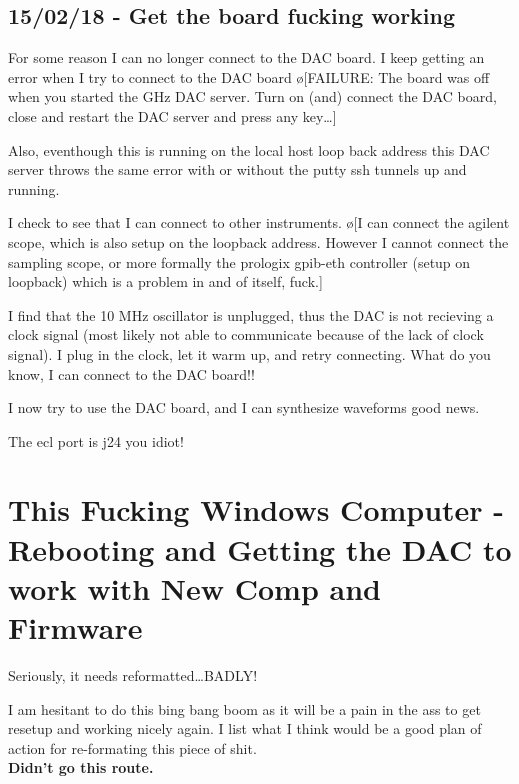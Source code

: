 \documentclass[10pt]{book}
\begin{document}
\section{15/02/18 - Get the board fucking working}
For some reason I can no longer connect to the DAC board. I keep getting an error when I try to connect to the DAC board \o[FAILURE: The board was off when you started the GHz DAC server. Turn on (and) connect the DAC board, close and restart the DAC server and press any key\ldots ]{}

Also, eventhough this is running on the local host loop back address this DAC server throws the same error with or without the putty ssh tunnels up and running.

I check to see that I can connect to other instruments. \o[I can connect the agilent scope, which is also setup on the loopback address. However I cannot connect the sampling scope, or more formally the prologix gpib-eth controller (setup on loopback) which is a problem in and of itself, fuck.]{}

I find that the 10 MHz oscillator is unplugged, thus the DAC is not recieving a clock signal (most likely not able to communicate because of the lack of clock signal). I plug in the clock, let it warm up, and retry connecting. What do you know, I can connect to the DAC board!!

I now try to use the DAC board, and I can synthesize waveforms good news.

The ecl port is j24 you idiot!


\chapter{This Fucking Windows Computer - Rebooting and Getting the DAC to work with New Comp and Firmware}
Seriously, it needs reformatted\ldots BADLY! 

I am hesitant to do this bing bang boom as it will be a pain in the ass to get resetup and working nicely again. I list what I think would be a good plan of action for re-formating this piece of shit.\\

{\bf Didn't go this route.}
\end{document}
